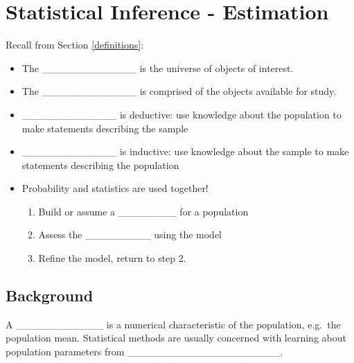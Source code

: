 \documentclass[]{book}
\providecommand{\tightlist}{%
  \setlength{\itemsep}{0pt}\setlength{\parskip}{0pt}}
\theoremstyle{definition}
\theoremstyle{definition}
\theoremstyle{remark}
\begin{document}
\section{Statistical Inference -
Estimation}\label{statistical-inference---estimation}

Recall from Section \ref{definitions}:

\begin{itemize}
\tightlist
\item
  The \_\_\_\_\_\_\_\_\_\_\_\_\_ is the universe of objects of interest.
  \vspace{.1in}
\item
  The \_\_\_\_\_\_\_\_\_\_\_\_\_ is comprised of the objects available
  for study. \vspace{.1in}
\item
  \_\_\_\_\_\_\_\_\_\_\_\_\_ is deductive: use knowledge about the
  population to make statements describing the sample \vspace{.1in}
\item
  \_\_\_\_\_\_\_\_\_\_\_\_\_ is inductive: use knowledge about the
  sample to make statements describing the population \vspace{.1in}
\item
  Probability and statistics are used together! \vspace{.1in}

  \begin{enumerate}
  \def\labelenumi{\arabic{enumi}.}
  \tightlist
  \item
    Build or assume a \_\_\_\_\_\_\_\_ for a population \vspace{.1in}
  \item
    Assess the \_\_\_\_\_\_\_\_\_ using the model \vspace{.1in}
  \item
    Refine the model, return to step 2.
  \end{enumerate}
\end{itemize}

\subsection{Background}\label{background}

A \_\_\_\_\_\_\_\_\_\_\_\_ is a numerical characteristic of the
population, e.g.~the population mean. Statistical methods are usually
concerned with learning about population parameters from
\_\_\_\_\_\_\_\_\_\_\_\_\_\_\_\_\_\_\_\_\_.
\end{document}
